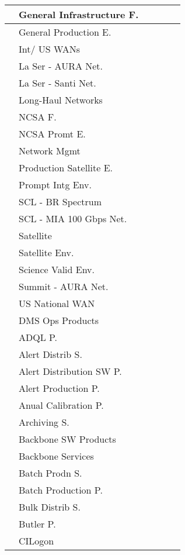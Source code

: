 \begin{longtable}{|p{}|p{}|p{}|p{}|p{}|p{}|}
 &  General Infrastructure F. &  &  &  & \\ \hline
 &  General Production E. &  &  &  & \\ \hline
 &  Int/ US WANs &  &  &  & \\ \hline
 &  La Ser - AURA Net. &  &  &  & \\ \hline
 &  La Ser - Santi Net. &  &  &  & \\ \hline
 &  Long-Haul Networks &  &  &  & \\ \hline
 &  NCSA F. &  &  &  & \\ \hline
 &  NCSA Promt E. &  &  &  & \\ \hline
 &  Network Mgmt &  &  &  & \\ \hline
 &  Production Satellite E. &  &  &  & \\ \hline
 &  Prompt Intg Env. &  &  &  & \\ \hline
 &  SCL - BR Spectrum &  &  &  & \\ \hline
 &  SCL - MIA 100 Gbps Net. &  &  &  & \\ \hline
 &  Satellite &  &  &  & \\ \hline
 &  Satellite Env. &  &  &  & \\ \hline
 &  Science Valid Env. &  &  &  & \\ \hline
 &  Summit - AURA Net. &  &  &  & \\ \hline
 &  US National WAN &  &  &  & \\ \hline
 &  DMS Ops Products &  &  &  & \\ \hline
 &  ADQL P. &  &  &  & \\ \hline
 &  Alert Distrib S. &  &  &  & \\ \hline
 &  Alert Distribution SW P. &  &  &  & \\ \hline
 &  Alert Production P. &  &  &  & \\ \hline
 &  Anual Calibration P. &  &  &  & \\ \hline
 &  Archiving S. &  &  &  & \\ \hline
 &  Backbone SW Products &  &  &  & \\ \hline
 &  Backbone Services &  &  &  & \\ \hline
 &  Batch Prodn S. &  &  &  & \\ \hline
 &  Batch Production P. &  &  &  & \\ \hline
 &  Bulk Distrib S. &  &  &  & \\ \hline
 &  Butler P. &  &  &  & \\ \hline
 &  CILogon &  &  &  & \\ \hline

\end{longtable}
